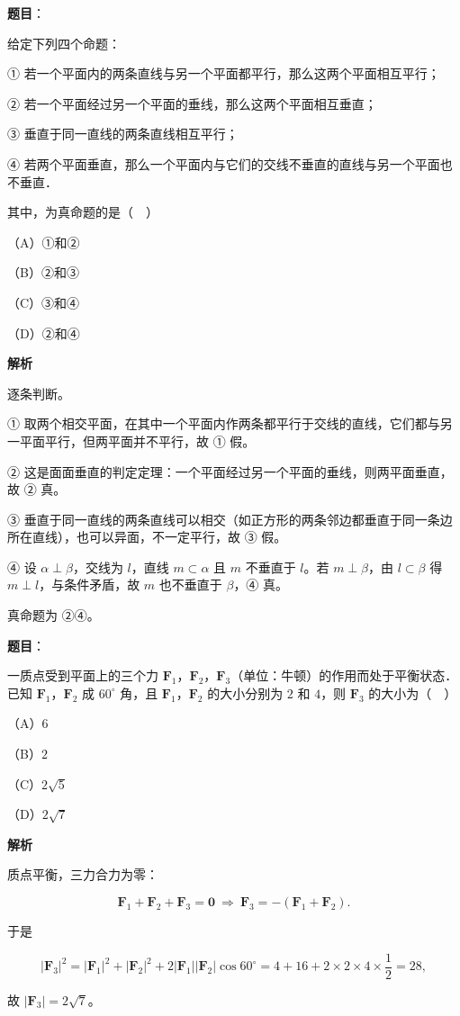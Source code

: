 \begin{answer}

\textbf{题目}：

给定下列四个命题：

① 若一个平面内的两条直线与另一个平面都平行，那么这两个平面相互平行；

② 若一个平面经过另一个平面的垂线，那么这两个平面相互垂直；

③ 垂直于同一直线的两条直线相互平行；

④ 若两个平面垂直，那么一个平面内与它们的交线不垂直的直线与另一个平面也不垂直．

其中，为真命题的是（　）

（A）①和②

（B）②和③

（C）③和④

（D）②和④

\textbf{解析}

逐条判断。

① 取两个相交平面，在其中一个平面内作两条都平行于交线的直线，它们都与另一平面平行，但两平面并不平行，故 ① 假。

② 这是面面垂直的判定定理：一个平面经过另一个平面的垂线，则两平面垂直，故 ② 真。

③ 垂直于同一直线的两条直线可以相交（如正方形的两条邻边都垂直于同一条边所在直线），也可以异面，不一定平行，故 ③ 假。

④ 设 $\alpha\perp\beta$，交线为 $l$，直线 $m\subset\alpha$ 且 $m$ 不垂直于 $l$。若 $m\perp\beta$，由 $l\subset\beta$ 得 $m\perp l$，与条件矛盾，故 $m$ 也不垂直于 $\beta$，④ 真。

真命题为 ②④。


\end{answer}
\begin{answer}

\textbf{题目}：

一质点受到平面上的三个力 $\boldsymbol F_1$，$\boldsymbol F_2$，$\boldsymbol F_3$（单位：牛顿）的作用而处于平衡状态．已知 $\boldsymbol F_1$，$\boldsymbol F_2$ 成 $60^\circ$ 角，且 $\boldsymbol F_1$，$\boldsymbol F_2$ 的大小分别为 $2$ 和 $4$，则 $\boldsymbol F_3$ 的大小为（　）

（A）$6$

（B）$2$

（C）$2\sqrt5$

（D）$2\sqrt7$

\textbf{解析}

质点平衡，三力合力为零：

\nopagebreak[4]
\[\boldsymbol F_1+\boldsymbol F_2+\boldsymbol F_3=\boldsymbol 0\ \Longrightarrow\ \boldsymbol F_3=-(\boldsymbol F_1+\boldsymbol F_2).\]

于是

\nopagebreak[4]
\[|\boldsymbol F_3|^2=|\boldsymbol F_1|^2+|\boldsymbol F_2|^2+2|\boldsymbol F_1||\boldsymbol F_2|\cos60^\circ=4+16+2\times2\times4\times\frac12=28,\]

故 $|\boldsymbol F_3|=2\sqrt7$。


\end{answer}

